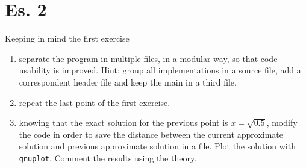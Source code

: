\section*{Es. 2}

Keeping in mind the first exercise

\begin{enumerate}

    \item separate the program in multiple files, in a modular way, so that
    code usability is improved. Hint: group all implementations in a source
    file, add a correspondent header file and keep the main in a third file.

    \item repeat the last point of the first exercise.

    \item knowing that the exact solution for the previous point is
    $x=\sqrt{0.5}$, modify the code in order to save the distance between the
    current approximate solution and previous approximate solution in a file.
    Plot the solution with \texttt{gnuplot}. Comment the results using the
    theory.

\end{enumerate}
